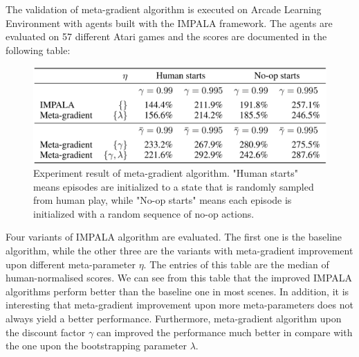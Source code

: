 \par
The validation of meta-gradient algorithm is executed on Arcade Learning Environment with agents built with the IMPALA framework. The agents are evaluated on 57 different Atari games and the scores are documented in the following table:
\begin{figure}[H]
	\includegraphics[scale=0.3]{meta-gradient-result.png}
	\centering
	\caption{Experiment result of meta-gradient algorithm. "Human starts" means episodes are initialized to a state that is randomly sampled from human play, while "No-op starts" means each episode is initialized with a random sequence of no-op actions.}
	\label{meta-gradient-result}
\end{figure}
Four variants of IMPALA algorithm are evaluated. The first one is the baseline algorithm, while the other three are the variants with meta-gradient improvement upon different meta-parameter $\eta$. The entries of this table are the median of human-normalised scores. We can see from this table that the improved IMPALA algorithms perform better than the baseline one in most scenes. In addition, it is interesting that meta-gradient improvement upon more meta-parameters does not always yield a better performance. Furthermore, meta-gradient algorithm upon the discount factor $\gamma$ can improved the performance much better in compare with the one upon the bootstrapping parameter $\lambda$.
% 
% 
% 